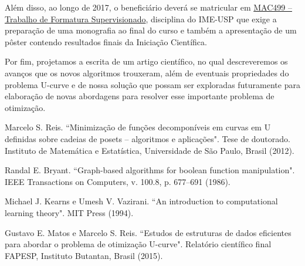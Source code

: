 \documentclass[12pt]{article}
\begin{document}
Além disso, ao longo de 2017, o beneficiário deverá se matricular em \href{https://uspdigital.usp.br/jupiterweb/obterDisciplina?sgldis=MAC0499\&nomdis=}{MAC499 -- Trabalho de Formatura Supervisionado}, disciplina do IME-USP que exige a preparação de uma monografia ao final do curso e também a apresentação de um pôster contendo resultados finais da Iniciação Científica.

Por fim, projetamos a escrita de um artigo científico, no qual descreveremos os avanços que os novos algoritmos trouxeram, além de eventuais propriedades do problema U-curve e de nossa solução que 
possam ser exploradas futuramente para elaboração de novas abordagens para resolver esse importante problema de otimização.

\begin{thebibliography}{}
    Marcelo S. Reis. ``Minimização de funções decomponíveis em curvas em U definidas sobre cadeias de posets -- algoritmos e aplicações".
    Tese de doutorado. Instituto de Matemática e Estatística, Universidade de São Paulo, Brasil (2012).

Randal E. Bryant. ``Graph-based algorithms for boolean function manipulation". IEEE Transactions on Computers, v. 100.8, p. 677--691 (1986). 

Michael J. Kearns e Umesh V. Vazirani. ``An introduction to computational learning theory". MIT Press (1994).

Gustavo E. Matos e Marcelo S. Reis. ``Estudos de estruturas de dados eficientes para abordar o problema de otimização U-curve". Relatório científico final FAPESP, Instituto Butantan, Brasil (2015).




\end{thebibliography}
\end{document}
